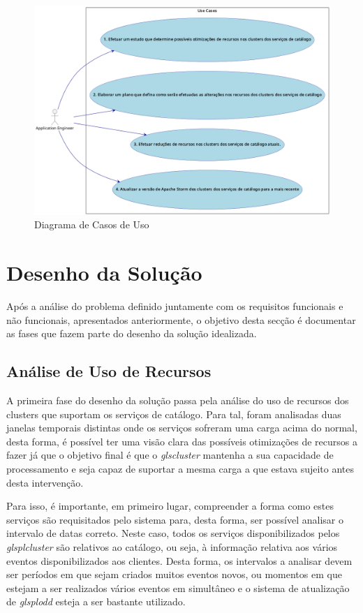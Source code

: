 \begin{figure}[H]
  \centerline{\includegraphics[scale=0.4]{media/content/analise/ucd.png}}
  \caption{Diagrama de Casos de Uso}
  \label{dcu}
\end{figure}

\section{Desenho da Solução}

Após a análise do problema definido juntamente com os requisitos funcionais e não funcionais,
apresentados anteriormente, o objetivo desta secção é documentar as fases que fazem parte do
desenho da solução idealizada.

\subsection{Análise de Uso de Recursos}

A primeira fase do desenho da solução passa pela análise do uso de recursos dos \glspl{cluster}
que suportam os serviços de catálogo. Para tal, foram analisadas duas janelas temporais distintas
onde os serviços sofreram uma carga acima do normal, desta forma, é possível ter uma visão clara
das possíveis otimizações de recursos a fazer já que o objetivo final é que o \textit{gls{cluster}}
mantenha a sua capacidade de processamento e seja capaz de suportar a mesma carga a que estava
sujeito antes desta intervenção.

Para isso, é importante, em primeiro lugar, compreender a forma como estes serviços são requisitados
pelo sistema para, desta forma, ser possível analisar o intervalo de datas correto. Neste caso,
todos os serviços disponibilizados pelos \textit{glspl{cluster}} são relativos ao catálogo, ou seja,
à informação relativa aos vários eventos disponibilizados aos clientes. Desta forma, os intervalos
a analisar devem ser períodos em que sejam criados muitos eventos novos, ou momentos em que
estejam a ser realizados vários eventos em simultâneo e o sistema de atualização de \textit{glspl{odd}}
esteja a ser bastante utilizado.

